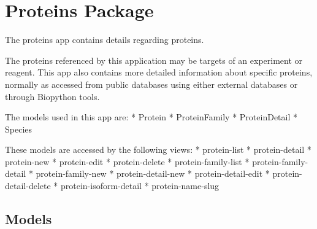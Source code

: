 \documentclass[letterpaper,10pt,english]{sphinxmanual}
\begin{document}
\section{Proteins Package}
\label{api:module-experimentdb.proteins}\label{api:proteins-package}
The proteins app contains details regarding proteins.

The proteins referenced by this application may be targets of an experiment or reagent.  This app also contains more detailed information about specific proteins, normally as accessed from public databases using either external databases or through Biopython tools.

The models used in this app are:
* Protein
* ProteinFamily
* ProteinDetail
* Species

These models are accessed by the following views:
* protein-list
* protein-detail
* protein-new
* protein-edit
* protein-delete
* protein-family-list
* protein-family-detail
* protein-family-new
* protein-detail-new
* protein-detail-edit
* protein-detail-delete
* protein-isoform-detail
* protein-name-slug


\subsection{Models}
\label{api:id13}\label{api:module-experimentdb.proteins.models}
\end{document}
